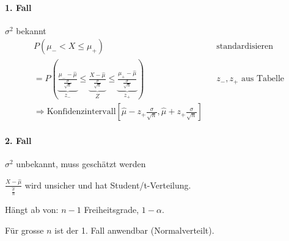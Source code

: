 \documentclass[10pt,a4paper]{scrartcl}
\begin{document}
\paragraph{1. Fall} $\sigma^2$ bekannt
\begin{align*}
  P(\mu_{-} < X \le \mu_{+}) &&\text{standardisieren} \\
  = P(\underbrace{\frac{\mu_{-} -\hat{\mu}}{\frac{\sigma}{\sqrt{n}}}}_{z_{-}} \le 
      \underbrace{\frac{X -\hat{\mu}}{\frac{\sigma}{\sqrt{n}}}}_{Z} \le 
      \underbrace{\frac{\mu_{+} -\hat{\mu}}{\frac{\sigma}{\sqrt{n}}}}_{z_{+}}) && z_-, z_+ \text{ aus Tabelle} \\
      \Rightarrow \text{Konfidenzintervall} \left[\hat{\mu}-z_+ \frac{\sigma}{\sqrt{n}}, \hat{\mu} + z_+ \frac{\sigma}{\sqrt{n}}\right]
\end{align*}

\paragraph{2. Fall} $\sigma^2$ unbekannt, muss geschätzt werden

$\frac{X - \hat{\mu}}{\hat{\frac{\sigma}{n}}}$ wird unsicher und hat Student/t-Verteilung.

Hängt ab von: $n-1$ Freiheitsgrade, $1-\alpha$.

Für grosse $n$ ist der 1. Fall anwendbar (Normalverteilt).
\end{document}
